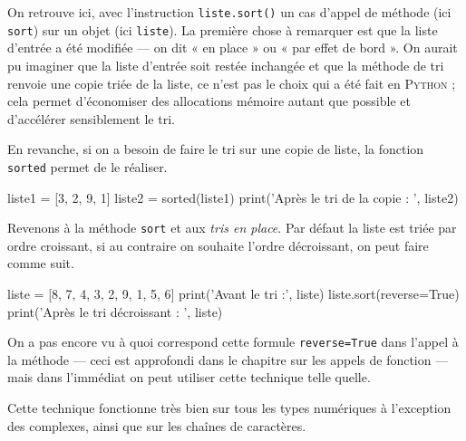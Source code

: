 On retrouve ici, avec l'instruction \texttt{liste.sort()} un cas d'appel de méthode (ici \texttt{sort}) sur un objet (ici \texttt{liste}).
La première chose à remarquer est que la liste d'entrée a été modifiée --- on dit « en place » ou « par effet de bord ».
On aurait pu imaginer que la liste d'entrée soit restée inchangée et que la méthode de tri renvoie une copie triée de la liste, ce n'est pas le choix qui a été fait en \textsc{Python} ; cela permet d'économiser des allocations mémoire autant que possible et d'accélérer sensiblement le tri.

\vspace{-1pt}

En revanche, si on a besoin de faire le tri sur une copie de liste, la fonction \texttt{sorted} permet de le réaliser.

\vspace{2pt}

\begin{idleconsole}
\begin{pyconsole}
liste1 = [3, 2, 9, 1]
liste2 = sorted(liste1)
print('Après le tri de la copie : ', liste2)
\end{pyconsole}
\end{idleconsole}

\vspace{2pt}

Revenons à la méthode \texttt{sort} et aux \textit{tris en place}. Par défaut la liste est triée par ordre croissant, si au contraire on souhaite l'ordre décroissant, on peut faire comme suit.

\vspace{2pt}

\begin{idleconsole}
\begin{pyconsole}
liste = [8, 7, 4, 3, 2, 9, 1, 5, 6]
print('Avant le tri :', liste)
liste.sort(reverse=True)
print('Après le tri décroissant : ', liste)
\end{pyconsole}
\end{idleconsole}

\vspace{2pt}

On a pas encore vu à quoi correspond cette formule \texttt{reverse=True} dans l'appel à la méthode --- ceci est approfondi dans le chapitre sur les appels de fonction --- mais dans l'immédiat on peut utiliser cette technique telle quelle.

Cette technique fonctionne très bien sur tous les types numériques à l'exception des complexes, ainsi que sur les chaînes de caractères. 

